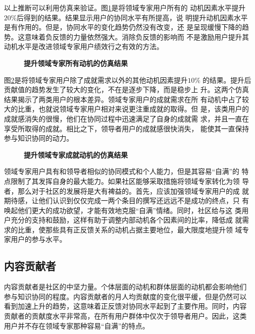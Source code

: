以上推断可以利用仿真来验证。图\ref{fig:improve4}是将领域专家用户所有的
动机因素水平提升$20\%$后得到的结果。结果显示用户的协同水平有所提高，说
明提升动机因素水平是有作用的。但是，协同水平的变化趋势仍然没有改变，还
是呈现缓慢下降的趋势。这意味着负反馈的力量依然强大。消除负反馈的影响而
不是激励用户提升其动机水平是改进领域专家用户绩效行之有效的方法。
\begin{figure}[!htb]
  \centering
   
 \caption{\small{\textbf{提升领域专家所有动机的仿真结果}}}
  \label{fig:improve4}
\end{figure}

图\ref{fig:improve3}是将领域专家用户除了成就需求以外的其他动机因素提升$10\%$
的结果。提升后贡献值的趋势发生了较大的变化，不在是逐步下降，而是稳步上
升。这两个仿真结果揭示了两类用户的根本差异。领域专家用户的成就需求在所
有动机中占了较大的比重，也就说领域专家用户相对来说更注重成就的取得。但
是，该类用户的成就感消失的很慢，他们在协同过程中迅速满足了自身的成就需
求，并且一直在享受所取得的成就。相比之下，领导者用户的成就感很快消失，
能使其一直保持参与知识协同的动力。

\begin{figure}[!htb]
  \centering
  \caption{\small{\textbf{提升领域专家成就动机的仿真结果}}}
   
  \label{fig:improve3}
\end{figure}

领域专家用户具有和领导者相似的协同模式和个人能力，但是其容易“自满”的
特点限制了其发挥自身的最大能力。如果社区能够采取措施将领域专家转化为领
导者，那么对于社区的发展将是大有裨益的。首先，应该加强领域专家用户的成
就期待感，让他们认识到仅仅完成一两个条目的撰写还远远不是成功的终点，只
有唤起他们更大的成功欲望，才能有效地克服“自满”情绪。同时，社区给与这
类用户充分的支持和鼓励，这样有助于调整内部动机各个因素间的比率，降低成
就需求的比重，使那些具有正反馈关系的动机占据主要地位，最大限度地提升领
域专家用户的参与水平。

\subsection{内容贡献者}

内容贡献者是社区的中坚力量。个体层面的动机和群体层面的动机都会影响他们
参与知识协同的程度。内容贡献者的月人均贡献度的变化很平缓，但是仍然可以
看到加速上升的趋势，这意味着正反馈对协同水平起到了主要作用。同时，内容
贡献者的贡献度水平非常高，在所有用户群体中仅次于领导者用户。因此，这类
用户并不存在领域专家那种容易“自满”的特点。

